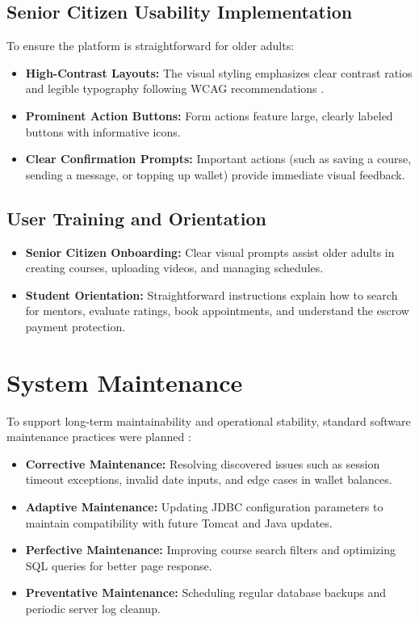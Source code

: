 \documentclass[12pt,a4paper]{report}
\begin{document}
\subsection{Senior Citizen Usability Implementation}
To ensure the platform is straightforward for older adults:
\begin{itemize}[leftmargin=1.5em, itemsep=2pt]
  \item \textbf{High-Contrast Layouts:} The visual styling emphasizes clear contrast ratios and legible typography following WCAG recommendations \cite{wcag21}.
  \item \textbf{Prominent Action Buttons:} Form actions feature large, clearly labeled buttons with informative icons.
  \item \textbf{Clear Confirmation Prompts:} Important actions (such as saving a course, sending a message, or topping up wallet) provide immediate visual feedback.
\end{itemize}

\subsection{User Training and Orientation}
\begin{itemize}[leftmargin=1.5em, itemsep=2pt]
  \item \textbf{Senior Citizen Onboarding:} Clear visual prompts assist older adults in creating courses, uploading videos, and managing schedules.
  \item \textbf{Student Orientation:} Straightforward instructions explain how to search for mentors, evaluate ratings, book appointments, and understand the escrow payment protection.
\end{itemize}

\section{System Maintenance}
To support long-term maintainability and operational stability, standard software maintenance practices were planned \cite{pressman}:
\begin{itemize}[leftmargin=1.5em, itemsep=2pt]
  \item \textbf{Corrective Maintenance:} Resolving discovered issues such as session timeout exceptions, invalid date inputs, and edge cases in wallet balances.
  \item \textbf{Adaptive Maintenance:} Updating JDBC configuration parameters to maintain compatibility with future Tomcat and Java updates.
  \item \textbf{Perfective Maintenance:} Improving course search filters and optimizing SQL queries for better page response.
  \item \textbf{Preventative Maintenance:} Scheduling regular database backups and periodic server log cleanup.
\end{itemize}
\end{document}
